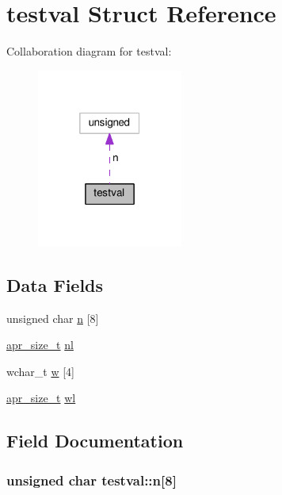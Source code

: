 \hypertarget{structtestval}{}\section{testval Struct Reference}
\label{structtestval}


Collaboration diagram for testval\+:
\nopagebreak
\begin{figure}[H]
\begin{center}
\leavevmode
\includegraphics[width=136pt]{structtestval__coll__graph}
\end{center}
\end{figure}
\subsection*{Data Fields}
\begin{DoxyCompactItemize}
\item 
unsigned char \hyperlink{structtestval_a01eaa953a0260fd13662963c0dc1484c}{n} \mbox{[}8\mbox{]}
\item 
\hyperlink{group__apr__platform_gaaa72b2253f6f3032cefea5712a27540e}{apr\+\_\+size\+\_\+t} \hyperlink{structtestval_a63d4f8e471e3dd98ff291337323ccd42}{nl}
\item 
wchar\+\_\+t \hyperlink{structtestval_aa0cd801062d92ef17707e77469397a51}{w} \mbox{[}4\mbox{]}
\item 
\hyperlink{group__apr__platform_gaaa72b2253f6f3032cefea5712a27540e}{apr\+\_\+size\+\_\+t} \hyperlink{structtestval_a61e60484d4f9aeacab5e4acc3d30312d}{wl}
\end{DoxyCompactItemize}


\subsection{Field Documentation}
\subsubsection[{\texorpdfstring{n}{n}}]{\setlength{\rightskip}{0pt plus 5cm}unsigned char testval\+::n\mbox{[}8\mbox{]}}\hypertarget{structtestval_a01eaa953a0260fd13662963c0dc1484c}{}\label{structtestval_a01eaa953a0260fd13662963c0dc1484c}
